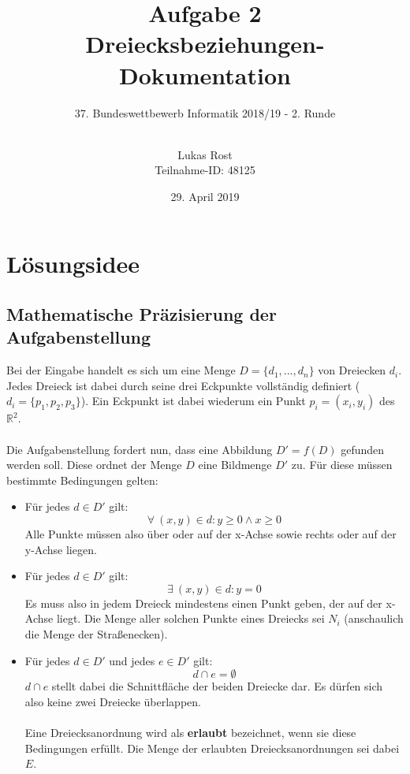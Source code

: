 \documentclass[a4paper, notitlepage, 12pt]{scrartcl}
\author{Lukas Rost \\ \small{Teilnahme-ID: 48125}}
\title{Aufgabe 2 \\ \glqq Dreiecksbeziehungen\grqq  - Dokumentation}
\subtitle{37. Bundeswettbewerb Informatik 2018/19 - 2. Runde \\~\\}
\date{29. April 2019}
\begin{document}
\renewcommand{\contentsname}{\centerline{Inhaltsverzeichnis}}
 \maketitle
 \tableofcontents
 \thispagestyle{empty}
 \newpage
 \setcounter{page}{1}
 
 \section{Lösungsidee}
 \subsection{Mathematische Präzisierung der Aufgabenstellung}
 Bei der Eingabe handelt es sich um eine Menge $D = \{d_1,...,d_n\}$ von Dreiecken $d_i$. Jedes Dreieck ist dabei durch seine drei Eckpunkte vollständig definiert ($d_i = \{p_1,p_2,p_3\}$). Ein Eckpunkt ist dabei wiederum ein Punkt $p_i = (x_i,y_i)$ des $\mathbb{R}^2$. \\ \\
 Die Aufgabenstellung fordert nun, dass eine Abbildung $D' = f(D)$ gefunden werden soll. Diese ordnet der Menge $D$ eine Bildmenge $D'$ zu. Für diese müssen bestimmte Bedingungen gelten:
 \begin{itemize}
 	\item Für jedes $d \in D'$ gilt:
 	\begin{equation}
 	\forall ~(x,y) \in d: y \geq 0 \wedge x \geq 0
 	\end{equation}
 	Alle Punkte müssen also über oder auf der x-Achse sowie rechts oder auf der y-Achse liegen.
 	\item Für jedes $d \in D'$ gilt:
 	\begin{equation}
 	\exists ~(x,y) \in d: y = 0
 	\end{equation}
 	Es muss also in jedem Dreieck mindestens einen Punkt geben, der auf der x-Achse liegt. Die Menge aller solchen Punkte eines Dreiecks sei $N_i$ (anschaulich die Menge der Straßenecken).
 	\item Für jedes $d \in D'$ und jedes $e \in D'$ gilt:
 	\begin{equation}
 	d \cap e = \emptyset
 	\end{equation}
 	$d \cap e$ stellt dabei die Schnittfläche der beiden Dreiecke dar. Es dürfen sich also keine zwei Dreiecke überlappen.\\ \\
 	Eine Dreiecksanordnung wird als \textbf{erlaubt} bezeichnet, wenn sie diese Bedingungen erfüllt. Die Menge der erlaubten Dreiecksanordnungen sei dabei $E$.
  \end{itemize}
\end{document}
